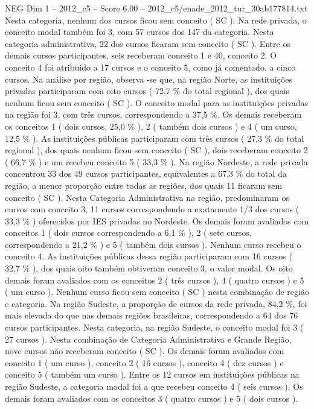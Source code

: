 \begin{textsample}{NEG Dim 1 – 2012\_c5 – Score 6.00 – 2012\_c5/enade\_2012\_tur\_30ab177814.txt}
Nesta categoria, nenhum dos cursos ficou sem conceito ( SC ).
Na rede privada, o conceito modal também foi 3, com 57 cursos dos 147 da categoria.
Nesta categoria administrativa, 22 dos cursos ficaram sem conceito ( SC ).
Entre os demais cursos participantes, seis receberam conceito 1 e 40, conceito 2.
O conceito 4 foi atribuído a 17 cursos e o conceito 5, como já comentado, a cinco cursos.
Na análise por região, observa -se que, na região Norte, as instituições privadas participaram com oito cursos ( 72,7 \% do total regional ), dos quais nenhum ficou sem conceito ( SC ).
O conceito modal para as instituições privadas na região foi 3, com três cursos, correspondendo a 37,5 \%.
Os demais receberam os conceitos 1 ( dois cursos, 25,0 \% ), 2 ( também dois cursos ) e 4 ( um curso, 12,5 \% ).
As instituições públicas participaram com três cursos ( 27,3 \% do total regional ), dos quais nenhum ficou sem conceito ( SC ), dois receberam conceito 2 ( 66,7 \% ) e um recebeu conceito 5 ( 33,3 \% ).
Na região Nordeste, a rede privada concentrou 33 dos 49 cursos participantes, equivalentes a 67,3 \% do total da região, a menor proporção entre todas as regiões, dos quais 11 ficaram sem conceito ( SC ).
Nesta Categoria Administrativa na região, predominaram os cursos com conceito 3, 11 cursos correspondendo a exatamente 1/3 dos cursos ( 33,3 \% ) oferecidos por IES privadas no Nordeste.
Os demais foram avaliados com conceitos 1 ( dois cursos correspondendo a 6,1 \% ), 2 ( sete cursos, correspondendo a 21,2 \% ) e 5 ( também dois cursos ).
Nenhum curso recebeu o conceito 4.
As instituições públicas dessa região participaram com 16 cursos ( 32,7 \% ), dos quais oito também obtiveram conceito 3, o valor modal.
Os oito demais foram avaliados com os conceitos 2 ( três cursos ), 4 ( quatro cursos ) e 5 ( um curso ).
Nenhum curso ficou sem conceito ( SC ) nesta combinação de região e categoria.
Na região Sudeste, a proporção de cursos da rede privada, 84,2 \%, foi mais elevada do que nas demais regiões brasileiras, correspondendo a 64 dos 76 cursos participantes.
Nesta categoria, na região Sudeste, o conceito modal foi 3 ( 27 cursos ).
Nesta combinação de Categoria Administrativa e Grande Região, nove cursos não receberam conceito ( SC ).
Os demais foram avaliados com conceito 1 ( um curso ), conceito 2 ( 16 cursos ), conceito 4 ( dez cursos ) e conceito 5 ( também um curso ).
Entre os 12 cursos em instituições públicas na região Sudeste, a categoria modal foi a que recebeu conceito 4 ( seis cursos ).
Os demais foram avaliados com os conceitos 3 ( quatro cursos ) e 5 ( dois cursos ).

\end{textsample}
